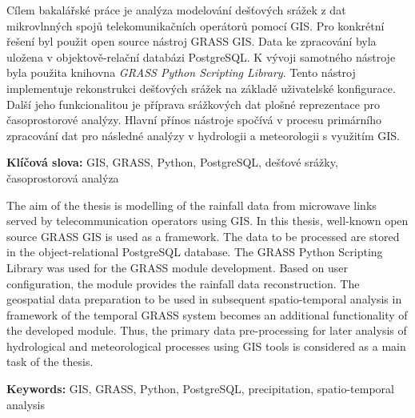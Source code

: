 \documentclass[a4paper,12pt,oneside]{report}
\author{Matěj Krejčí}
\newenvironment{abstractpage}
  {\cleardoublepage\vspace*{\fill}\thispagestyle{empty}}
  {\vfill\cleardoublepage}
\newenvironment{abstractx}[1]
  {\bigskip\selectlanguage{#1}%
   \begin{center}\bfseries\abstractname\end{center}}
  {\par\bigskip}
\newcommand{\klicslova}[2]{\noindent\textbf{#1: }#2}
\begin{document}
\pagestyle{empty}




\renewcommand{\bibname}{Literatura}
\renewcommand{\contentsname}{Obsah}
\renewcommand{\figurename}{Obr.}
\renewcommand{\tablename}{Tab.}



\renewcommand\footnotelayout{\footnotesize}



\newpage


\begin{abstractpage}
\begin{abstractx}{czech}

  Cílem bakalářské práce je analýza modelování dešťových srážek z dat
  mikrovlnných spojů telekomunikačních operátorů pomocí GIS. Pro
  konkrétní řešení byl použit open source nástroj GRASS GIS. Data ke
  zpracování byla uložena v objektově-relační databázi PostgreSQL. K
  vývoji samotného nástroje byla použita knihovna \textit{GRASS Python
    Scripting Library}. Tento nástroj implementuje rekonstrukci
  dešťových srážek na základě uživatelské konfigurace. Další jeho
  funkcionalitou je příprava srážkových dat plošné reprezentace pro
  časoprostorové analýzy. Hlavní přínos nástroje spočívá v procesu
  primárního zpracování dat pro následné analýzy v hydrologii a
  meteorologii s využitím GIS.


  \klicslova{Klíčová slova}{GIS, GRASS, Python, PostgreSQL,
    dešťové srážky, \newline časoprostorová analýza}
\end{abstractx}

\begin{abstractx}{english}

  The aim of the thesis is modelling of the rainfall data from
  microwave links served by telecommunication operators using GIS. In
  this thesis, well-known open source GRASS GIS is used as a
  framework. The data to be processed are stored in the
  object-relational PostgreSQL database. The GRASS Python Scripting
  Library was used for the GRASS module development. Based on user
  configuration, the module provides the rainfall data
  reconstruction. The geospatial data preparation to be used in
  subsequent spatio-temporal analysis in framework of the temporal
  GRASS system becomes an additional functionality of the developed
  module. Thus, the primary data pre-processing for later analysis of
  hydrological and meteorological processes using GIS tools is
  considered as a main task of the thesis.

  \klicslova{Keywords}{GIS, GRASS, Python, PostgreSQL,
    precipitation, spatio-temporal analysis}
\end{abstractx}
\end{abstractpage}
\end{document}
